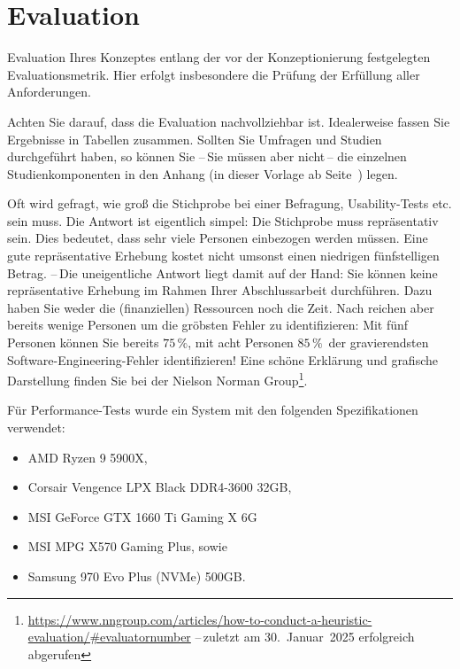 \chapter{Evaluation}\label{chap:Evaluation}
Evaluation Ihres Konzeptes entlang der vor der Konzeptionierung festgelegten Evaluationsmetrik. Hier erfolgt insbesondere die Prüfung der Erfüllung aller Anforderungen.

Achten Sie darauf, dass die Evaluation nachvollziehbar ist. Idealerweise fassen Sie Ergebnisse in Tabellen zusammen. Sollten Sie Umfragen und Studien durchgeführt haben, so können Sie --\,Sie müssen aber nicht\,-- die einzelnen Studienkomponenten in den Anhang (in dieser Vorlage ab Seite~\pageref{apdx:A}) legen.

Oft wird gefragt, wie groß die Stichprobe bei einer Befragung, Usability-Tests etc. sein muss. Die Antwort ist eigentlich simpel: Die Stichprobe muss repräsentativ sein. Dies bedeutet, dass sehr viele Personen einbezogen werden müssen. Eine gute repräsentative Erhebung kostet nicht umsonst einen niedrigen fünfstelligen Betrag. --\,Die uneigentliche Antwort liegt damit auf der Hand: Sie können keine repräsentative Erhebung im Rahmen Ihrer Abschlussarbeit durchführen. Dazu haben Sie weder die (finanziellen) Ressourcen noch die Zeit. Nach \cite{nielsen1990,nielsen1994} reichen aber bereits wenige Personen um die gröbsten Fehler zu identifizieren: Mit fünf Personen können Sie bereits $75\,\%$, mit acht Personen $85\,\%$\, der gravierendsten Software-Engineering-Fehler identifizieren! Eine schöne Erklärung und grafische Darstellung finden Sie bei der Nielson Norman Group\footnote{\url{https://www.nngroup.com/articles/how-to-conduct-a-heuristic-evaluation/\#evaluatornumber} --\,zuletzt am 30.~Januar~2025 erfolgreich abgerufen}.


\noindent Für Performance-Tests wurde ein System mit den folgenden Spezifikationen verwendet:
\begin{itemize}
    \item AMD Ryzen 9 5900X,
    \item Corsair Vengence LPX Black DDR4-3600 32GB,
    \item MSI GeForce GTX 1660 Ti Gaming X 6G
    \item MSI MPG X570 Gaming Plus, sowie
    \item Samsung 970 Evo Plus (NVMe) 500GB.
\end{itemize}